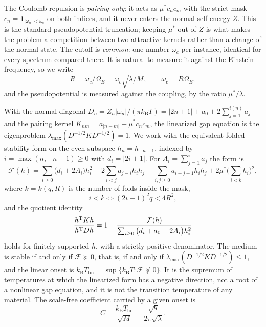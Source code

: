 \documentclass[11pt]{article}
\newcommand{\kb}{k_{\mathrm B}}
\newcommand{\Tlin}{T_{\mathrm{lin}}}
\newcommand{\OmE}{\Omega_E}
\newcommand{\Fcal}{\mathcal F}
\newcommand{\muS}{\mu^{*}}
\theoremstyle{definition}
\theoremstyle{remark}
\begin{document}
The Coulomb repulsion is \emph{pairing only}: it acts as $\muS c_nc_m$ with the strict
mask $c_n=\mathbf 1_{|\omega_n|<\omega_c}$ on both indices, and it never enters the normal
self-energy $Z$. This is the standard pseudopotential truncation; keeping $\muS$ out of
$Z$ is what makes the problem a competition between two attractive kernels rather than a
change of the normal state. The cutoff is \emph{common}: one number $\omega_c$ per
instance, identical for every spectrum compared there. It is natural to measure it
against the Einstein frequency, so we write
\begin{equation}\label{eq:R}
R=\omega_c/\OmE=\omega_c\sqrt{\lambda/M},\qquad \omega_c=R\OmE,
\end{equation}
and the pseudopotential is measured against the coupling, by the ratio
$\muS/\lambda$.

With the normal diagonal $D_n=Z_n|\omega_n|/(\pi\kb T)=|2n+1|+a_0+2\sum_{j=1}^{i(n)}a_j$ and the
pairing kernel $K_{nm}=a_{|n-m|}-\muS c_nc_m$, the linearized gap equation is the
eigenproblem $\lambda_{\max}(D^{-1/2}KD^{-1/2})=1$. We work with the equivalent folded
stability form on the even subspace $h_n=h_{-n-1}$, indexed by
$i=\max(n,-n-1)\ge0$ with $d_i=|2i+1|$. For $A_i=\sum_{j=1}^{i}a_j$ the form is
\begin{equation}\label{eq:form}
\Fcal(h)=\sum_{i\ge0}\big(d_i+2A_i\big)h_i^2
-2\sum_{i<j}a_{j-i}h_ih_j
-\sum_{i,j\ge0}a_{i+j+1}h_ih_j
+2\muS\Big(\sum_{i<k}h_i\Big)^2 ,
\end{equation}
where $k=k(q,R)$ is the number of folds inside the mask,
\begin{equation}\label{eq:mask}
i<k\iff (2i+1)^2q<4R^2 ,
\end{equation}
and the quotient identity
\begin{equation}\label{eq:quotient}
\frac{h^{\rm T}Kh}{h^{\rm T}Dh}
=1-\frac{\Fcal(h)}{\sum_{i\ge0}\big(d_i+a_0+2A_i\big)h_i^2}
\end{equation}
holds for finitely supported $h$, with a strictly positive denominator. The medium is
stable if and only if $\Fcal\succeq0$, that is, if and only if
$\lambda_{\max}(D^{-1/2}KD^{-1/2})\le1$, and the linear onset is
$\kb\Tlin=\sup\{\kb T:\Fcal\not\succeq0\}$. It is the supremum of temperatures at which the
linearized form has a negative direction, not a root of a nonlinear gap equation, and it
is not the transition temperature of any material. The scale-free coefficient carried by
a given onset is
\begin{equation}\label{eq:C}
C=\frac{\kb\Tlin}{\sqrt M}=\frac{\sqrt q}{2\pi\sqrt\lambda}.
\end{equation}
\end{document}
